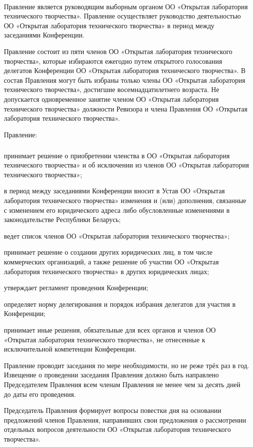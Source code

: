 \documentclass[a4paper,fontsize=14pt,titlepage]{scrartcl}
\makeatletter
\newenvironment{numberedpars}{%
  \addtocounter{secnumdepth}{1}
  \renewcommand\theparagraph{\arabic{section}.\arabic{paragraph}}
  \renewcommand\@seccntformat[1]
  {\expandafter\ifx\csname##1\endcsname\paragraph\csname 
  the##1\endcsname\else\csname the##1\endcsname\quad\fi}
  \let\old@par=\par
  \def\new@par{\let\par=\old@par\paragraph{}\let\par=\new@par}
  \let\par=\new@par
  \par
}{
  \addtocounter{secnumdepth}{-1}
}
\newenvironment{numberedsubpars}{%
  \addtocounter{secnumdepth}{1}
  \renewcommand\thesubparagraph{\arabic{section}.\arabic{paragraph}.\arabic{subparagraph}}
  \renewcommand\@seccntformat[1]
  {\expandafter\ifx\csname##1\endcsname\subparagraph\csname 
  the##1\endcsname\else\csname the##1\endcsname\quad\fi}
  \let\old@@par=\par
  \def\new@@par{\let\par=\old@par\subparagraph{}\let\par=\new@@par}
  \let\par=\new@@par
  \par
}{
  \addtocounter{secnumdepth}{-1}
  \let\par=\old@@par
}
\makeatother
\begin{document}
\begin{numberedpars}
Правление является руководящим выборным органом ОО «Открытая лаборатория технического творчества». Правление
осуществляет руководство деятельностью ОО «Открытая лаборатория технического творчества» в период между заседаниями
Конференции.

Правление состоит из пяти членов ОО «Открытая лаборатория технического творчества», которые избираются ежегодно путем
открытого голосования делегатов Конференции ОО «Открытая лаборатория технического творчества». В состав Правления могут
быть избраны только члены ОО «Открытая лаборатория технического творчества», достигшие восемнадцатилетнего возраста. Не
допускается одновременное занятие членом ОО «Открытая лаборатория технического творчества» должности Ревизора и члена
Правления ОО «Открытая лаборатория технического творчества».

Правление:
\begin{numberedsubpars}
принимает решение о приобретении членства в ОО «Открытая лаборатория технического творчества» и об исключении из членов
ОО «Открытая лаборатория технического творчества»;

в период между заседаниями Конференции вносит в Устав ОО «Открытая лаборатория технического творчества» изменения и
(или) дополнения, связанные с изменением его юридического адреса либо обусловленные изменениями в законодательстве
Республики Беларусь;

ведет список членов ОО «Открытая лаборатория технического творчества»;

принимает решение о создании других юридических лиц, в том числе коммерческих организаций, а также решение об участии ОО
«Открытая лаборатория технического творчества» в других юридических лицах;

утверждает регламент проведения Конференции;

определяет норму делегирования и порядок избрания делегатов для участия в Конференции;

принимает иные решения, обязательные для всех органов и членов ОО «Открытая лаборатория технического творчества», не
отнесенные к исключительной компетенции Конференции.
\end{numberedsubpars}

Правление проводит заседания по мере необходимости, но не реже трёх раз в год. Извещение о проведении заседания
Правления должно быть направлено Председателем Правления всем членам Правления не менее чем за десять дней до даты его
проведения.

Председатель Правления формирует вопросы повестки дня на основании предложений членов Правления, направивших свои
предложения о рассмотрении отдельных вопросов деятельности ОО «Открытая лаборатория технического творчества».


\end{numberedpars}
\end{document}
